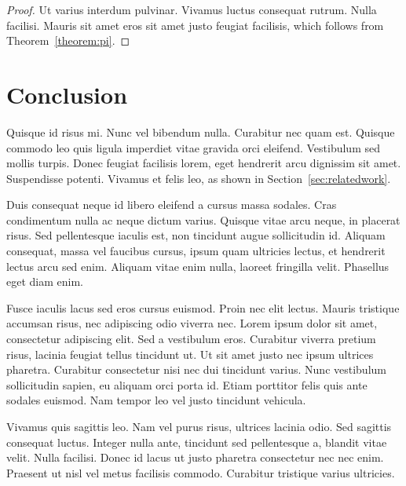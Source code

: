 \documentclass[submission]{gmp2018}
\begin{document}
\begin{proof}
Ut varius interdum pulvinar. Vivamus luctus consequat rutrum. Nulla facilisi. Mauris sit amet eros sit amet justo feugiat facilisis, which follows from Theorem~\ref{theorem:pi}.
\end{proof}


\section{Conclusion}

Quisque id risus mi. Nunc vel bibendum nulla. Curabitur nec quam est. Quisque commodo leo quis ligula imperdiet vitae gravida orci eleifend. Vestibulum sed mollis turpis. Donec feugiat facilisis lorem, eget hendrerit arcu dignissim sit amet. Suspendisse potenti. Vivamus et felis leo, as shown in Section~\ref{sec:relatedwork}.

Duis consequat neque id libero eleifend a cursus massa sodales. Cras condimentum nulla ac neque dictum varius. Quisque vitae arcu neque, in placerat risus. Sed pellentesque iaculis est, non tincidunt augue sollicitudin id. Aliquam consequat, massa vel faucibus cursus, ipsum quam ultricies lectus, et hendrerit lectus arcu sed enim. Aliquam vitae enim nulla, laoreet fringilla velit. Phasellus eget diam enim.

Fusce iaculis lacus sed eros cursus euismod. Proin nec elit lectus. Mauris tristique accumsan risus, nec adipiscing odio viverra nec. Lorem ipsum dolor sit amet, consectetur adipiscing elit. Sed a vestibulum eros. Curabitur viverra pretium risus, lacinia feugiat tellus tincidunt ut. Ut sit amet justo nec ipsum ultrices pharetra. Curabitur consectetur nisi nec dui tincidunt varius. Nunc vestibulum sollicitudin sapien, eu aliquam orci porta id. Etiam porttitor felis quis ante sodales euismod. Nam tempor leo vel justo tincidunt vehicula.

Vivamus quis sagittis leo. Nam vel purus risus, ultrices lacinia odio. Sed sagittis consequat luctus. Integer nulla ante, tincidunt sed pellentesque a, blandit vitae velit. Nulla facilisi. Donec id lacus ut justo pharetra consectetur nec nec enim. Praesent ut nisl vel metus facilisis commodo. Curabitur tristique varius ultricies.




\end{document}
